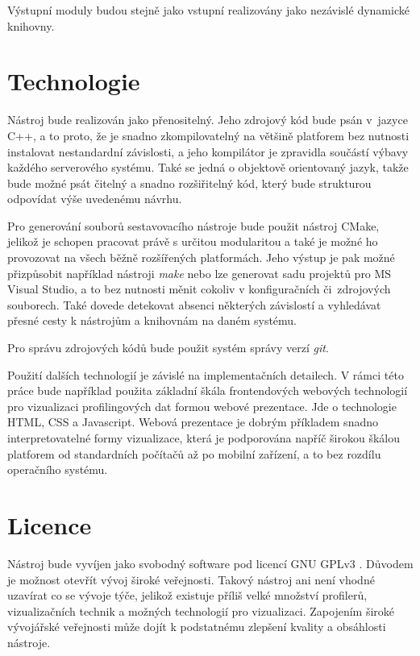 \documentclass[czech,BP]{thesiskiv}
\begin{document}
Výstupní moduly budou stejně jako vstupní realizovány jako nezávislé dynamické knihovny.

\section{Technologie}

Nástroj bude realizován jako přenositelný. Jeho zdrojový kód bude psán v~jazyce C++, a to proto, že je snadno zkompilovatelný na většině platforem bez nutnosti instalovat nestandardní závislosti, a jeho kompilátor je zpravidla součástí výbavy každého serverového systému. Také se jedná o objektově orientovaný jazyk, takže bude možné psát čitelný a snadno rozšiřitelný kód, který bude strukturou odpovídat výše uvedenému návrhu.

Pro generování souborů sestavovacího nástroje bude použit nástroj CMake, jelikož je schopen pracovat právě s určitou modularitou a také je možné ho provozovat na všech běžně rozšířených platformách. Jeho výstup je pak možné přizpůsobit například nástroji \emph{make} nebo lze generovat sadu projektů pro MS Visual Studio, a to bez nutnosti měnit cokoliv v konfiguračních či~zdrojových souborech. Také dovede detekovat absenci některých závislostí a vyhledávat přesné cesty k nástrojům a knihovnám na daném systému.

Pro správu zdrojových kódů bude použit systém správy verzí \emph{git}.

Použití dalších technologií je závislé na implementačních detailech. V rámci této práce bude například použita základní škála frontendových webových technologií pro vizualizaci profilingových dat formou webové prezentace. Jde o technologie HTML, CSS a Javascript. Webová prezentace je dobrým příkladem snadno interpretovatelné formy vizualizace, která je podporována napříč širokou škálou platforem od standardních počítačů až po mobilní zařízení, a to bez rozdílu operačního systému.

\section{Licence}

Nástroj bude vyvíjen jako svobodný software pod licencí GNU GPLv3 \cite{gplv3}. Důvodem je možnost otevřít vývoj široké veřejnosti. Takový nástroj ani není vhodné uzavírat co se vývoje týče, jelikož existuje příliš velké množství profilerů, vizualizačních technik a možných technologií pro vizualizaci. Zapojením široké vývojářské veřejnosti může dojít k podstatnému zlepšení kvality a obsáhlosti nástroje.
\end{document}
